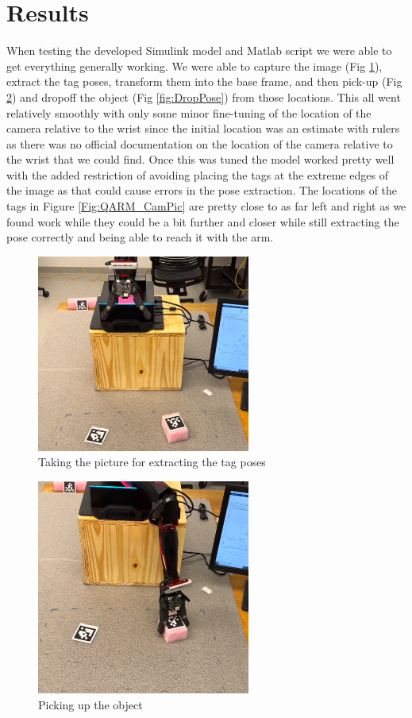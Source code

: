 \section{Results}

When testing the developed Simulink model and Matlab script we were able to get everything generally working. We were able to capture the image (Fig \ref{fig:cameraPose}), extract the tag poses, transform them into the base frame, and then pick-up (Fig \ref{fig:PickPose}) and dropoff the object (Fig \ref{fig:DropPose}) from those locations. This all went relatively smoothly with only some minor fine-tuning of the location of the camera relative to the wrist since the initial location was an estimate with rulers as there was no official documentation on the location of the camera relative to the wrist that we could find. Once this was tuned the model worked pretty well with the added restriction of avoiding placing the tags at the extreme edges of the image as that could cause errors in the pose extraction. The locations of the tags in Figure \ref{Fig:QARM_CamPic} are pretty close to as far left and right as we found work while they could be a bit further and closer while still extracting the pose correctly and being able to reach it with the arm.

\begin{figure}[htb]
\centering
\label{fig:cameraPose}
\includegraphics[width=7cm]{Figures/CamPic.jpeg}
\caption{Taking the picture for extracting the tag poses}
\centering
\end{figure}

\begin{figure}[htb]
\centering
\label{fig:PickPose}
\includegraphics[width=7cm]{Figures/PickObject.jpeg}
\caption{Picking up the object}
\centering
\end{figure}


